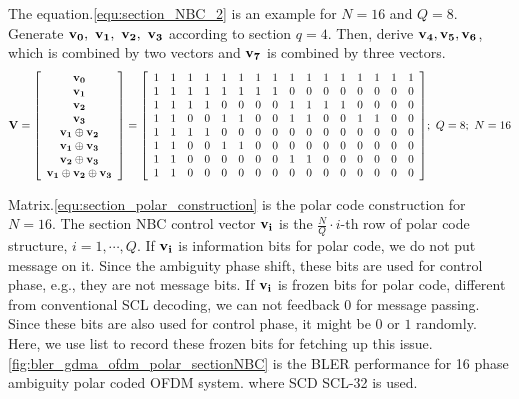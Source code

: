 The equation.\ref{equ:section_NBC_2} is an example for $N=16$ and $Q=8$. Generate $\bf v_0, \ v_1, \ v_2, \ v_3$ according to section $q=4$. Then, derive $\bf v_4, v_5, v_6$, which is combined by two vectors and $\bf v_7$ is combined by three vectors. 
\begin{equation}
{\bf V} = {
\left[ \begin{array}{ccc}

\bf v_0 \\
\bf v_1 \\
\bf v_2 \\
\bf v_3 \\
\bf v_1 \oplus v_2 \\
\bf v_1 \oplus v_3 \\
\bf v_2 \oplus v_3 \\
\bf v_1 \oplus v_2 \oplus v_3
\end{array} 
\right ]} = {
\left[ \begin{array}{cccccccccccccccc}
1 & 1 & 1 & 1 & 1 & 1 & 1 & 1 & 1 & 1 & 1 & 1 & 1 & 1 & 1 & 1\\
1 & 1 & 1 & 1 & 1 & 1 & 1 & 1 & 0 & 0 & 0 & 0 & 0 & 0 & 0 & 0\\
1 & 1 & 1 & 1 & 0 & 0 & 0 & 0 & 1 & 1 & 1 & 1 & 0 & 0 & 0 & 0\\
1 & 1 & 0 & 0 & 1 & 1 & 0 & 0 & 1 & 1 & 0 & 0 & 1 & 1 & 0 & 0\\
1 & 1 & 1 & 1 & 0 & 0 & 0 & 0 & 0 & 0 & 0 & 0 & 0 & 0 & 0 & 0\\
1 & 1 & 0 & 0 & 1 & 1 & 0 & 0 & 0 & 0 & 0 & 0 & 0 & 0 & 0 & 0\\
1 & 1 & 0 & 0 & 0 & 0 & 0 & 0 & 1 & 1 & 0 & 0 & 0 & 0 & 0 & 0\\
1 & 1 & 0 & 0 & 0 & 0 & 0 & 0 & 0 & 0 & 0 & 0 & 0 & 0 & 0 & 0
\end{array}
\right ]}; \ Q=8; \ N=16
\label{equ:section_NBC_2}
\end{equation}

Matrix.\ref{equ:section_polar_construction} is the polar code construction for $N=16$. The section NBC control vector $\bf{v_i}$ is the $\frac{N}{Q} \cdot i$-th row of polar code structure, $i = 1 , \cdots, Q$. If $\bf{v_i}$ is information bits for polar code,  we do not put message on it. Since the ambiguity phase shift, these bits are used for control phase, e.g., they are not message bits. If $\bf {v_i}$ is frozen bits for polar code, different from conventional SCL decoding, we can not feedback $0$ for message passing. Since these bits are also used for control phase, it might be $0$ or $1$ randomly. Here, we use list to record these frozen bits for fetching up this issue. \ref{fig:bler_gdma_ofdm_polar_sectionNBC} is the BLER performance for 16 phase ambiguity polar coded OFDM system. where SCD SCL-32 is used.



